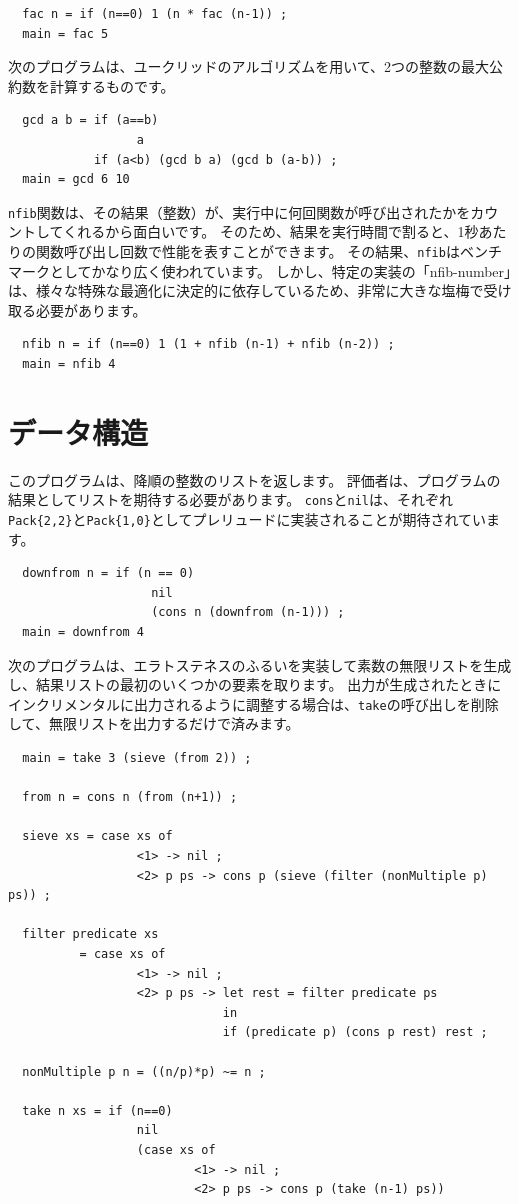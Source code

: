\documentclass{jbook}
\begin{document}
\begin{verbatim}
  fac n = if (n==0) 1 (n * fac (n-1)) ;
  main = fac 5
\end{verbatim}

次のプログラムは、ユークリッドのアルゴリズムを用いて、2つの整数の最大公約数を計算するものです。

\begin{verbatim}
  gcd a b = if (a==b)
                  a
            if (a<b) (gcd b a) (gcd b (a-b)) ;
  main = gcd 6 10
\end{verbatim}

\texttt{nfib}関数は、その結果（整数）が、実行中に何回関数が呼び出されたかをカウントしてくれるから面白いです。
そのため、結果を実行時間で割ると、1秒あたりの関数呼び出し回数で性能を表すことができます。
その結果、\texttt{nfib}はベンチマークとしてかなり広く使われています。
しかし、特定の実装の「nfib-number」は、様々な特殊な最適化に決定的に依存しているため、非常に大きな塩梅で受け取る必要があります。

\begin{verbatim}
  nfib n = if (n==0) 1 (1 + nfib (n-1) + nfib (n-2)) ;
  main = nfib 4
\end{verbatim}

\section{データ構造}

このプログラムは、降順の整数のリストを返します。
評価者は、プログラムの結果としてリストを期待する必要があります。
\texttt{cons}と\texttt{nil}は、それぞれ\texttt{Pack\{2,2\}}と\texttt{Pack\{1,0\}}としてプレリュードに実装されることが期待されています。

\begin{verbatim}
  downfrom n = if (n == 0)
                    nil
                    (cons n (downfrom (n-1))) ;
  main = downfrom 4
\end{verbatim}

次のプログラムは、エラトステネスのふるいを実装して素数の無限リストを生成し、結果リストの最初のいくつかの要素を取ります。
出力が生成されたときにインクリメンタルに出力されるように調整する場合は、\texttt{take}の呼び出しを削除して、無限リストを出力するだけで済みます。

\begin{verbatim}
  main = take 3 (sieve (from 2)) ;

  from n = cons n (from (n+1)) ;

  sieve xs = case xs of
                  <1> -> nil ;
                  <2> p ps -> cons p (sieve (filter (nonMultiple p) ps)) ;

  filter predicate xs
          = case xs of
                  <1> -> nil ;
                  <2> p ps -> let rest = filter predicate ps
                              in
                              if (predicate p) (cons p rest) rest ;

  nonMultiple p n = ((n/p)*p) ~= n ;

  take n xs = if (n==0)
                  nil
                  (case xs of
                          <1> -> nil ;
                          <2> p ps -> cons p (take (n-1) ps))
\end{verbatim}
\end{document}
